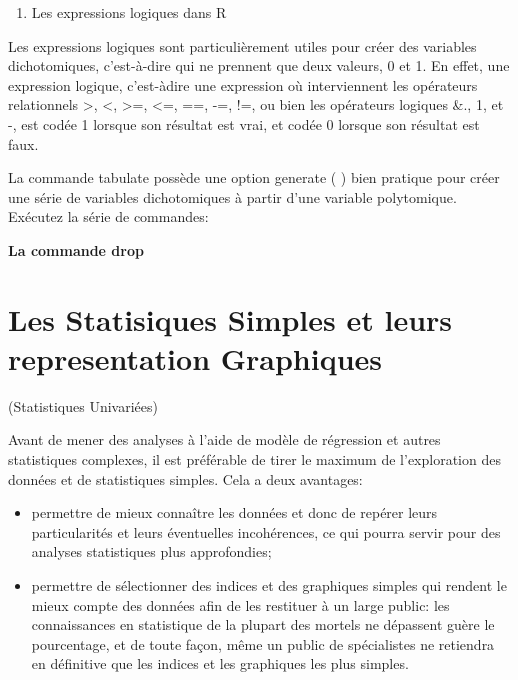 \documentclass[
]{book}
\providecommand{\tightlist}{%
  \setlength{\itemsep}{0pt}\setlength{\parskip}{0pt}}
\begin{document}
\begin{enumerate}
\def\labelenumi{(\arabic{enumi})}
\setcounter{enumi}{2}
\tightlist
\item
  Les expressions logiques dans R
\end{enumerate}

Les expressions logiques sont particulièrement utiles pour créer
des variables dichotomiques, c'est-à-dire qui ne prennent que
deux valeurs, 0 et 1. En effet, une expression logique, c'est-àdire
une expression où interviennent les opérateurs relationnels
\textgreater, \textless, \textgreater=, \textless=, ==, -=, !=, ou bien les opérateurs logiques \&., 1, et
-, est codée 1 lorsque son résultat est vrai, et codée 0 lorsque
son résultat est faux.

La commande tabulate possède une option generate ( ) bien
pratique pour créer une série de variables dichotomiques à partir
d'une variable polytomique. Exécutez la série de commandes:

\textbf{La commande drop}

\hypertarget{les-statisiques-simples-et-leurs-representation-graphiques}{%
\chapter{Les Statisiques Simples et leurs representation Graphiques}\label{les-statisiques-simples-et-leurs-representation-graphiques}}

(Statistiques Univariées)

Avant de mener des analyses à l'aide de modèle de régression et
autres statistiques complexes, il est préférable de tirer le
maximum de l'exploration des données et de statistiques
simples. Cela a deux avantages:

\begin{itemize}
\tightlist
\item
  permettre de mieux connaître les données et donc de repérer
  leurs particularités et leurs éventuelles incohérences, ce qui
  pourra servir pour des analyses statistiques plus
  approfondies;
\item
  permettre de sélectionner des indices et des graphiques
  simples qui rendent le mieux compte des données afin de les
  restituer à un large public: les connaissances en statistique de
  la plupart des mortels ne dépassent guère le pourcentage, et
  de toute façon, même un public de spécialistes ne retiendra en
  définitive que les indices et les graphiques les plus simples.
\end{itemize}
\end{document}
